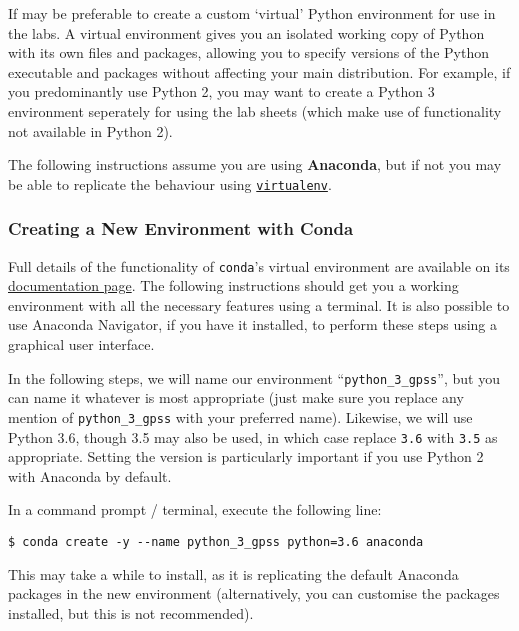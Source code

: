 \documentclass[11pt]{article}
\begin{document}
If may be preferable to create a custom `virtual' Python environment for
use in the labs. A virtual environment gives you an isolated working
copy of Python with its own files and packages, allowing you to specify
versions of the Python executable and packages without affecting your
main distribution. For example, if you predominantly use Python 2, you
may want to create a Python 3 environment seperately for using the lab
sheets (which make use of functionality not available in Python 2).

The following instructions assume you are using \textbf{Anaconda}, but
if not you may be able to replicate the behaviour using
\href{https://virtualenv.pypa.io/en/stable/}{\texttt{virtualenv}}.

\hypertarget{creating-a-new-environment-with-conda}{%
\subsubsection{Creating a New Environment with
Conda}\label{creating-a-new-environment-with-conda}}

Full details of the functionality of \texttt{conda}'s virtual
environment are available on its
\href{https://conda.io/docs/user-guide/tasks/manage-environments.html}{documentation
page}. The following instructions should get you a working environment
with all the necessary features using a terminal. It is also possible to
use Anaconda Navigator, if you have it installed, to perform these steps
using a graphical user interface.

In the following steps, we will name our environment
``\texttt{python\_3\_gpss}'', but you can name it whatever is most
appropriate (just make sure you replace any mention of
\texttt{python\_3\_gpss} with your preferred name). Likewise, we will
use Python 3.6, though 3.5 may also be used, in which case replace
\texttt{3.6} with \texttt{3.5} as appropriate. Setting the version is
particularly important if you use Python 2 with Anaconda by default.

In a command prompt / terminal, execute the following line:

\begin{verbatim}
$ conda create -y --name python_3_gpss python=3.6 anaconda
\end{verbatim}

This may take a while to install, as it is replicating the default
Anaconda packages in the new environment (alternatively, you can
customise the packages installed, but this is not recommended).
\end{document}
